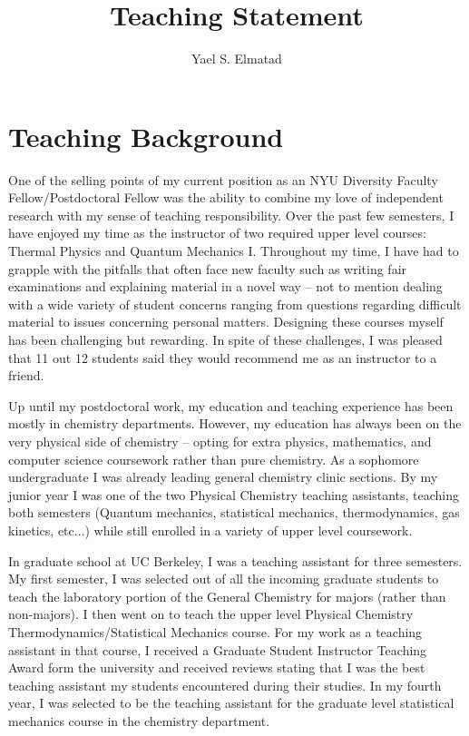 \documentclass[11pt]{article}
\title{{Teaching Statement}}
\author{Yael S. Elmatad}
\date{}                                           %
\begin{document}
\maketitle
%

\section{Teaching Background}

One of the selling points of my current position as an NYU Diversity Faculty Fellow/Postdoctoral Fellow was the ability to combine my love of independent research with my sense of teaching responsibility.  Over the past few semesters, I have enjoyed my time as the instructor of two required upper level courses: Thermal Physics and Quantum Mechanics I.  Throughout my time, I have had to grapple with the pitfalls that often face new faculty such as writing fair examinations and explaining material in a novel way -- not to mention dealing with a wide variety of student concerns ranging from questions regarding difficult material to issues concerning personal matters.  Designing these courses myself has been challenging but rewarding.  In spite of these challenges, I was pleased that 11 out 12 students said they would recommend me as an instructor to a friend. 

Up until my postdoctoral work, my education and teaching experience has been mostly in chemistry departments.  However, my education has always been on the very physical side of chemistry -- opting for extra physics, mathematics, and computer science coursework rather than pure chemistry.  As a sophomore undergraduate I was already leading general chemistry clinic sections.  By my junior year I was one of the two Physical Chemistry teaching assistants, teaching both semesters (Quantum mechanics, statistical mechanics, thermodynamics, gas kinetics, etc...) while still enrolled in a variety of upper level coursework.

In graduate school at UC Berkeley, I was a teaching assistant for three semesters.  My first semester, I was selected out of all the incoming graduate students to teach the laboratory portion of the General Chemistry for majors (rather than non-majors). I then went on to teach the upper level Physical Chemistry Thermodynamics/Statistical Mechanics course.  For my work as a teaching assistant in that course, I received a Graduate Student Instructor Teaching Award form the university and received reviews stating that I was the best teaching assistant my students encountered during their studies.  In my fourth year, I was selected to be the teaching assistant for the graduate level statistical mechanics course in the chemistry department.
\end{document}
